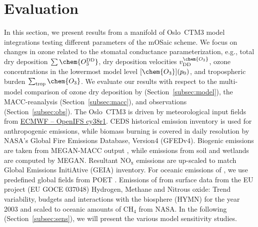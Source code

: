 \documentclass[gmd, manuscript]{copernicus}
\begin{document}
\section{Evaluation}
\label{sec:eval}
In this section, we present results from a manifold of Oslo~CTM3 model integrations testing different parameters of the mOSaic scheme. We focus on changes in ozone related to the stomatal conductance parameterization, e.g., total dry deposition $\sum\chem{O_3^\text{DD}}$, dry deposition velocities $v^\chem{O_3}_\text{DD}$, ozone concentrations in the lowermost model level $[\chem{O_3}](p_0)$, and tropospheric burden $\sum_\text{trop}\chem{O_3}$. We evaluate our results with respect to the multi-model comparison of ozone dry deposition by \citet{ACP:Hardacre2015} (Section~\ref{subsec:model}), the MACC-reanalysis (Section~\ref{subsec:macc}), and observations (Section~\ref{subsec:obs}). The Oslo~CTM3 is driven by meteorological input fields from \href{https://www.ecmwf.int/en/forecasts/documentation-and-support/evolution-ifs/cycle-38r1-summary-changes}{ECMWF -- OpenIFS cy38r1}. CEDS historical emission inventory is used for anthropogenic emissions, while biomass burning is covered in daily resolution by NASA's Global Fire Emissions Database, Version4 (GFEDv4). Biogenic emissions are taken from MEGAN-MACC output \citep{ACP:Sindelarova2014}, while emissions from soil and wetlands are computed by MEGAN. Resultant $\mathrm{NO_x}$ emissions are up-scaled to match Global Emissions InitiAtive (GEIA) inventory. For oceanic emissions of , we use predefined global fields from POET \citep{POET}. Emissions of  from surface data from the EU project (EU GOCE 037048) Hydrogen, Methane and Nitrous oxide: Trend variability, budgets and interactions with the biosphere (HYMN) for the year 2003 and scaled to oceanic amounts of $\mathrm{CH_4}$ from NASA. In the following (Section~\ref{subsec:sens}), we will present the various model sensitivity studies.
\end{document}
